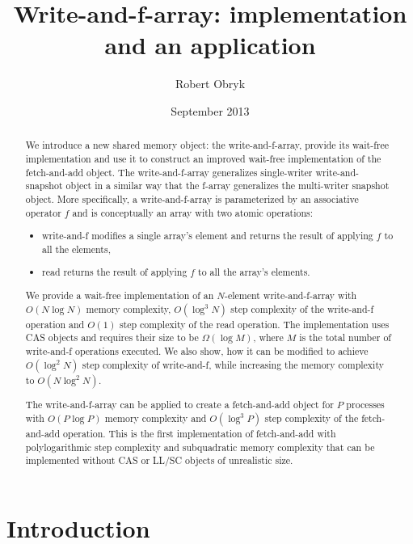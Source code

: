 \documentclass{thesis}
\author{Robert Obryk}
\title{Write-and-f-array: implementation and an application}
\date{September 2013}
\begin{document}
\maketitle
\begin{abstract}
	We introduce a new shared memory object: the write-and-f-array, provide its wait-free implementation and use it to construct an improved wait-free implementation of the fetch-and-add object. The write-and-f-array generalizes single-writer write-and-snapshot\cite{write-and-snap} object in a similar way that the f-array\cite{f-array} generalizes the multi-writer snapshot object. More specifically, a write-and-f-array is parameterized by an associative operator $f$ and is conceptually an array with two atomic operations:

\begin{itemize}
\item write-and-f modifies a single array's element and returns the result of applying $f$ to all the elements,
\item read returns the result of applying $f$ to all the array's elements.
\end{itemize}

We provide a wait-free implementation of an $N$-element write-and-f-array with $O(N \log N)$ memory complexity, $O(\log^3 N)$ step complexity of the write-and-f operation and $O(1)$ step complexity of the read operation. The implementation uses CAS objects and requires their size to be $\Omega(\log M)$, where $M$ is the total number of write-and-f operations executed. We also show, how it can be modified to achieve $O(\log^2 N)$ step complexity of write-and-f, while increasing the memory complexity to $O(N \log^2 N)$.

The write-and-f-array can be applied to create a fetch-and-add object for $P$ processes with $O(P \log P)$ memory complexity and $O(\log^3 P)$ step complexity of the fetch-and-add operation. This is the first implementation of fetch-and-add with polylogarithmic step complexity and subquadratic memory complexity that can be implemented without CAS or LL/SC objects of unrealistic size\cite{ellen-fai}.
\end{abstract}
\clearpage
\tableofcontents
\clearpage
\chapter{Introduction}
\end{document}
